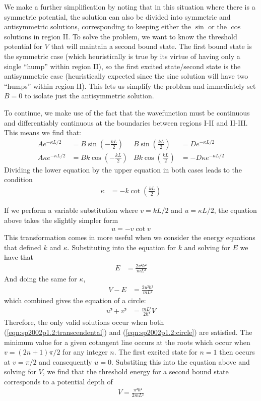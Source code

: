 We make a further simplification by noting that in this situation where there
is a symmetric potential, the solution can also be divided into symmetric
and antisymmetric solutions, corresponding to keeping either the $\sin$ or
the $\cos$ solutions in region II. To solve the problem, we want to know the
threshold potential for $V$ that will maintain a second bound state. The first
bound state is the symmetric case (which heuristically is true by its virtue
of having only a single ``hump'' within region II), so the first excited
state/second state is the antisymmetric case (heuristically expected since
the sine solution will have two ``humps'' within region II). This lets us
simplify the problem and immediately set $B = 0$ to isolate just the
antisymmetric solution.

To continue, we make use of the fact that the wavefunction must be continuous
and differentiably continuous at the boundaries between regions I-II and
II-III. This means we find that:
\begin{align*}
    Ae^{-κL/2} &= B\sin(-\frac{kL}{2})
    & B\sin(\frac{kL}{2}) &= De^{-κL/2}
    \\
    Aκe^{-κL/2} &= Bk\cos(-\frac{kL}{2})
    & Bk\cos(\frac{kL}{2}) &= -Dκe^{-κL/2}
\end{align*}
Dividing the lower equation by the upper equation in both cases leads to the
condition
\begin{align*}
    κ &= -k\cot(\frac{kL}{2})
\end{align*}

If we perform a variable substitution where $v = kL/2$ and $u = κL/2$, the
equation above takes the slightly simpler form
\begin{align}
    u = -v\cot v
	\label{eqn:sp2002p1.2:transcendental}
\end{align}
This transformation comes in more useful when we consider the energy equations
that defined $k$ and $κ$. Substituting into the equation for $k$ and solving
for $E$ we have that
\begin{align*}
    E &= \frac{2v²ℏ²}{mL²}
\end{align*}
And doing the same for $κ$,
\begin{align*}
    V - E &= \frac{2u²ℏ²}{mL²}
\end{align*}
which combined gives the equation of a circle:
\begin{align*}
    u² + v² &= \frac{mL²}{2ℏ²}V
	\label{eqn:sp2002p1.2:circle}
\end{align*}
Therefore, the only valid solutions occur when both
(\ref{eqn:sp2002p1.2:transcendental}) and (\ref{eqn:sp2002p1.2:circle}) are
satisfied. The minimum value for a given cotangent line occurs at the roots
which occur when $v = (2n+1)π/2$ for any integer $n$. The first excited state
for $n=1$ then occurs at $v = π/2$ and consequently $u = 0$. Substiting this
into the equation above and solving for $V$, we find that the threshold energy
for a second bound state corresponds to a potential depth of
\begin{align}
    \boxed{ V = \frac{π²ℏ²}{2mL²} }
\end{align}

